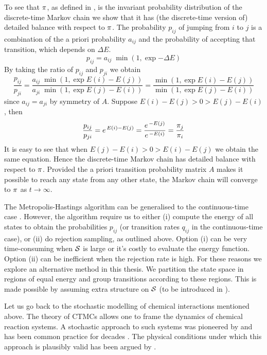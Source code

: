 To see that $\pi$, as defined in ,
is the invariant probability distribution
of the discrete-time Markov chain
we show that it has (the discrete-time version of)
detailed balance with respect to $\pi$.
The probability $p_{ij}$ of jumping from $i$ to $j$ is
a combination of the a priori probability $a_{ij}$ and
the probability of accepting that transition,
which depends on $\Delta E$.
\[ p_{ij} = a_{ij}\; \min(1, \exp{-\Delta E}) \]
By taking the ratio of $p_{ij}$ and $p_{ji}$ we obtain
\[ \frac{p_{ij}}{p_{ji}} =
   \frac{a_{ij}\; \min(1, \exp{E(i)-E(j)})}{
         a_{ji}\; \min(1, \exp{E(j)-E(i)})} =
   \frac{\min(1, \exp{E(i)-E(j)})}{
         \min(1, \exp{E(j)-E(i)})} \]
since $a_{ij} = a_{ji}$ by symmetry of $A$.
Suppose $E(i)-E(j) > 0 > E(j)-E(i)$, then
\[ \frac{p_{ij}}{p_{ji}} = e^{\,E(i)-E(j)}
     = \frac{e^{\,-E(j)}}{e^{\,-E(i)}}
     = \frac{\pi_{j}}{\pi_{i}} \]
It is easy to see that when
$E(j)-E(i) > 0 > E(i)-E(j)$ we obtain the same equation.
Hence the discrete-time Markov chain has detailed balance
with respect to $\pi$. %
Provided the a priori transition probability matrix $A$
makes it possible to reach any state from any other state,
the Markov chain will converge to $\pi$ as $t \to \infty$.

The Metropolis-Hastings algorithm can be generalised
to the continuous-time case \citep{diaconis}.
However, the algorithm require us to either
(i) compute the energy of all states to obtain the probabilities
$p_{ij}$ (or transition rates $q_{ij}$ in the continuous-time case),
or (ii) do rejection sampling, as outlined above.
Option (i) can be very time-consuming when $\mathcal{S}$ is large
or it's costly to evaluate the energy function.
Option (ii) can be inefficient when the rejection rate is high.
For these reasons we explore an alternative method in this thesis.
We partition the state space in regions of equal energy
and group transitions according to these regions.
This is made possible by assuming extra structure on $\mathcal{S}$
(to be introduced in ).

Let us go back to the stochastic modelling of
chemical interactions mentioned above.
The theory of CTMCs allows one to frame
the dynamics of chemical reaction systems.
A stochastic approach to such systems
was pioneered by \citet{delbruck}
and has been common practice for decades
\citep{mcquarrie-stoch-kinetics}.
The physical conditions under which this approach is plausibly valid
has been argued by \citet{gillespie76}.

